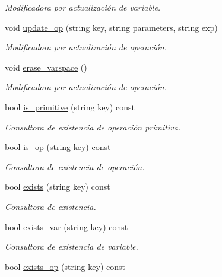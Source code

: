 \begin{DoxyCompactItemize}
\begin{DoxyCompactList}\small\item\em Modificadora por actualización de variable. \end{DoxyCompactList}\item 
void \hyperlink{class_environment_ab2b86b9ca99b0fb9f95d4976266aeed1}{update\+\_\+op} (string key, string parameters, string exp)
\begin{DoxyCompactList}\small\item\em Modificadora por actualización de operación. \end{DoxyCompactList}\item 
void \hyperlink{class_environment_a82a2e7e7920575b6e09b1dfaaf062f68}{erase\+\_\+varspace} ()
\begin{DoxyCompactList}\small\item\em Modificadora por actualización de operación. \end{DoxyCompactList}\item 
bool \hyperlink{class_environment_a8949b818539cc0caae637f61f8271640}{is\+\_\+primitive} (string key) const 
\begin{DoxyCompactList}\small\item\em Consultora de existencia de operación primitiva. \end{DoxyCompactList}\item 
bool \hyperlink{class_environment_a18ebd27038386a636917cbb2bc1583df}{is\+\_\+op} (string key) const 
\begin{DoxyCompactList}\small\item\em Consultora de existencia de operación. \end{DoxyCompactList}\item 
bool \hyperlink{class_environment_a4b2500663ebbc031bfdb18b3301492c4}{exists} (string key) const 
\begin{DoxyCompactList}\small\item\em Consultora de existencia. \end{DoxyCompactList}\item 
bool \hyperlink{class_environment_ace3eae39aed1b747a18ab27e45dc96b7}{exists\+\_\+var} (string key) const 
\begin{DoxyCompactList}\small\item\em Consultora de existencia de variable. \end{DoxyCompactList}\item 
bool \hyperlink{class_environment_a323ca63fc26be47fa45d14dd783761e1}{exists\+\_\+op} (string key) const 

\end{DoxyCompactItemize}

